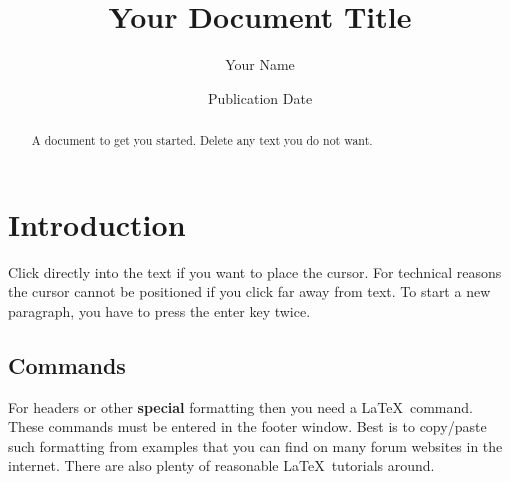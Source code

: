 \documentclass[a4paper, 11pt]{article}
\title{Your Document Title}
\author{Your Name}
\date{Publication Date}
\begin{document}

\maketitle

\begin{abstract}
A document to get you started. Delete any text you do not want.
\end{abstract}

\section{Introduction}
Click directly into the text if you want to place the cursor. For technical reasons the cursor cannot be positioned if you click far away from text.  To start a new paragraph, you have to press the enter key twice.

\subsection{Commands}

For headers or other \textbf{special} formatting then you need a  \LaTeX\ command. These commands must be entered in the footer window. Best is to copy/paste such formatting from examples that you can find on many forum websites in the internet. There are also plenty of reasonable  \LaTeX\ tutorials around.


\end{document}

